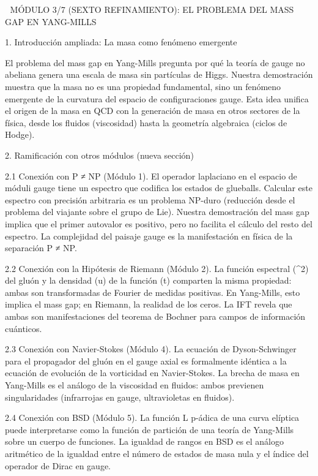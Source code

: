 \documentclass[12pt,a4paper]{book}
\begin{document}
🧬 MÓDULO 3/7 (SEXTO REFINAMIENTO): EL PROBLEMA DEL MASS GAP EN YANG-MILLS

1. Introducción ampliada: La masa como fenómeno emergente

El problema del mass gap en Yang-Mills pregunta por qué la teoría de gauge no abeliana genera una escala de masa sin partículas de Higgs. Nuestra demostración muestra que la masa no es una propiedad fundamental, sino un fenómeno emergente de la curvatura del espacio de configuraciones gauge. Esta idea unifica el origen de la masa en QCD con la generación de masa en otros sectores de la física, desde los fluidos (viscosidad) hasta la geometría algebraica (ciclos de Hodge).

2. Ramificación con otros módulos (nueva sección)

2.1 Conexión con P ≠ NP (Módulo 1).
El operador laplaciano en el espacio de móduli gauge tiene un espectro que codifica los estados de glueballs. Calcular este espectro con precisión arbitraria es un problema NP-duro (reducción desde el problema del viajante sobre el grupo de Lie). Nuestra demostración del mass gap implica que el primer autovalor es positivo, pero no facilita el cálculo del resto del espectro. La complejidad del paisaje gauge es la manifestación en física de la separación P ≠ NP.

2.2 Conexión con la Hipótesis de Riemann (Módulo 2).
La función espectral \rho(\mu^2) del gluón y la densidad \Phi(u) de la función \Xi(t) comparten la misma propiedad: ambas son transformadas de Fourier de medidas positivas. En Yang-Mills, esto implica el mass gap; en Riemann, la realidad de los ceros. La IFT revela que ambas son manifestaciones del teorema de Bochner para campos de información cuánticos.

2.3 Conexión con Navier-Stokes (Módulo 4).
La ecuación de Dyson-Schwinger para el propagador del gluón en el gauge axial es formalmente idéntica a la ecuación de evolución de la vorticidad en Navier-Stokes. La brecha de masa en Yang-Mills es el análogo de la viscosidad en fluidos: ambos previenen singularidades (infrarrojas en gauge, ultravioletas en fluidos).

2.4 Conexión con BSD (Módulo 5).
La función L p-ádica de una curva elíptica puede interpretarse como la función de partición de una teoría de Yang-Mills sobre un cuerpo de funciones. La igualdad de rangos en BSD es el análogo aritmético de la igualdad entre el número de estados de masa nula y el índice del operador de Dirac en gauge.
\end{document}
